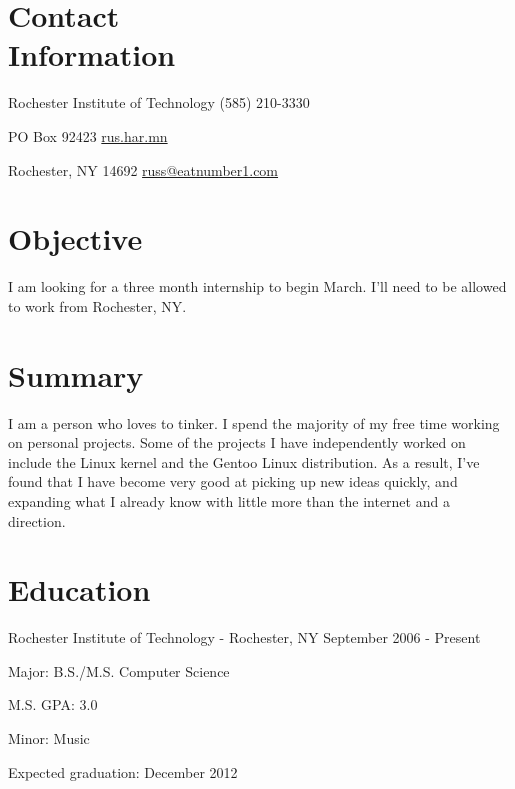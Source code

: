 \documentclass[a4paper,margin,line]{resume}
\newcommand{\rdate}[1]{\hfill {\small #1}}
\begin{document}
\begin{resume}
\section{\mysidestyle Contact \\ Information} \vspace{2mm}
	\begin{asparablank}
		\item Rochester Institute of Technology \hfill (585) 210-3330
		\item PO Box 92423 \hfill \href{http://rus.har.mn/}{rus.har.mn}
		\item Rochester, NY 14692 \hfill \href{mailto:russ@eatnumber1.com}{russ@eatnumber1.com}
	\end{asparablank}

\section{\mysidestyle Objective}
	I am looking for a three month internship to begin March. I'll need to be allowed to work from Rochester, NY.

\section{\mysidestyle Summary}
	I am a person who loves to tinker. I spend the majority of my free time working on personal projects. Some of the projects I have independently worked on include the Linux kernel and the Gentoo Linux distribution.  As a result, I've found that I have become very good at picking up new ideas quickly, and expanding what I already know with little more than the internet and a direction.

\section{\mysidestyle Education}
	\begin{compactdesc}
		\item[Rochester Institute of Technology] - Rochester, NY \rdate{September 2006 - Present}
		\begin{compactitem} { \small
			\item Major: B.S./M.S. Computer Science
			\item M.S. GPA: 3.0
			\item Minor: Music
			\item Expected graduation: December 2012
		} \end{compactitem}
	\end{compactdesc}


\end{resume}
\end{document}
